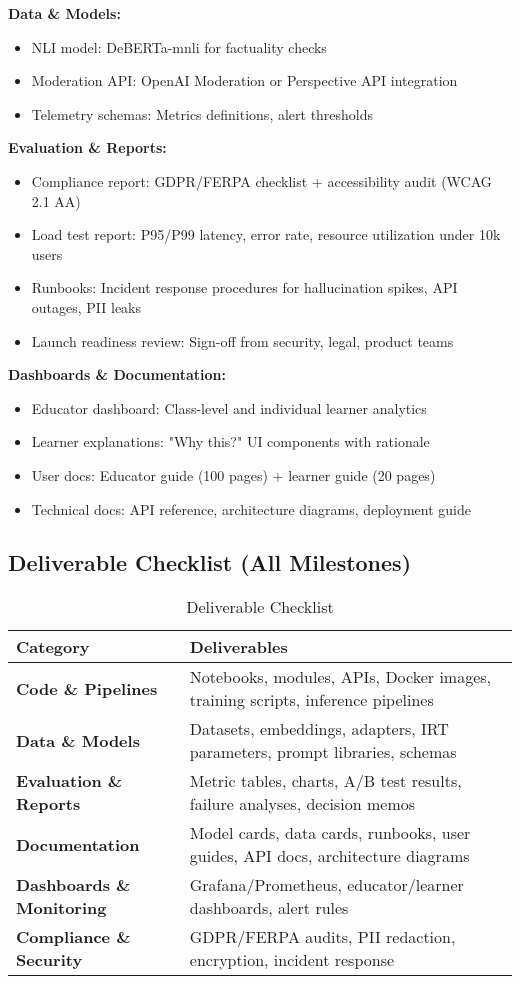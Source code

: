 \documentclass[11pt,letterpaper]{article}
\begin{document}
\textbf{Data \& Models:}
\begin{itemize}
\item NLI model: DeBERTa-mnli for factuality checks
\item Moderation API: OpenAI Moderation or Perspective API integration
\item Telemetry schemas: Metrics definitions, alert thresholds
\end{itemize}

\textbf{Evaluation \& Reports:}
\begin{itemize}
\item Compliance report: GDPR/FERPA checklist + accessibility audit (WCAG 2.1 AA)
\item Load test report: P95/P99 latency, error rate, resource utilization under 10k users
\item Runbooks: Incident response procedures for hallucination spikes, API outages, PII leaks
\item Launch readiness review: Sign-off from security, legal, product teams
\end{itemize}

\textbf{Dashboards \& Documentation:}
\begin{itemize}
\item Educator dashboard: Class-level and individual learner analytics
\item Learner explanations: "Why this?" UI components with rationale
\item User docs: Educator guide (100 pages) + learner guide (20 pages)
\item Technical docs: API reference, architecture diagrams, deployment guide
\end{itemize}

\subsection{Deliverable Checklist (All Milestones)}

\begin{table}[H]
\centering
\small
\begin{tabular}{@{}p{5cm}p{9cm}@{}}
\toprule
\textbf{Category} & \textbf{Deliverables} \\
\midrule
\textbf{Code \& Pipelines} & Notebooks, modules, APIs, Docker images, training scripts, inference pipelines \\
\textbf{Data \& Models} & Datasets, embeddings, adapters, IRT parameters, prompt libraries, schemas \\
\textbf{Evaluation \& Reports} & Metric tables, charts, A/B test results, failure analyses, decision memos \\
\textbf{Documentation} & Model cards, data cards, runbooks, user guides, API docs, architecture diagrams \\
\textbf{Dashboards \& Monitoring} & Grafana/Prometheus, educator/learner dashboards, alert rules \\
\textbf{Compliance \& Security} & GDPR/FERPA audits, PII redaction, encryption, incident response \\
\bottomrule
\end{tabular}
\caption{Deliverable Checklist}
\end{table}
\end{document}
